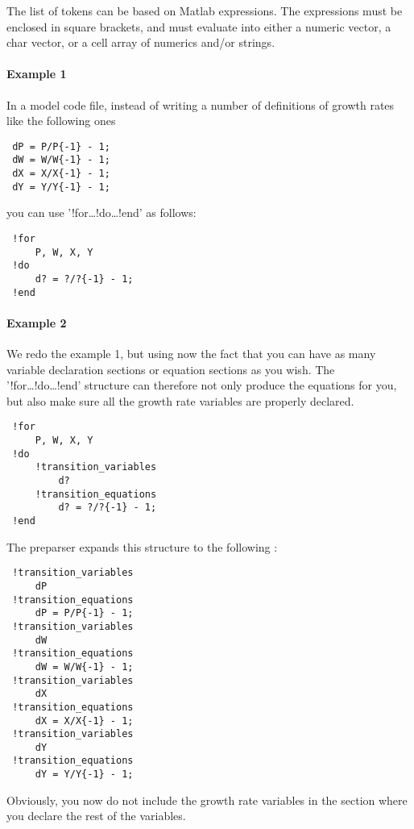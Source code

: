  The list of tokens can be based on Matlab expressions. The expressions
 must be enclosed in square brackets, and must evaluate into either a
 numeric vector, a char vector, or a cell array of numerics and/or
 strings.
 
 \paragraph{Example 1}
 
 In a model code file, instead of writing a number of definitions of
 growth rates like the following ones
 
 \begin{verbatim}
 dP = P/P{-1} - 1;
 dW = W/W{-1} - 1;
 dX = X/X{-1} - 1;
 dY = Y/Y{-1} - 1;
 \end{verbatim}
 
 you can use '!for\ldots{}!do\ldots{}!end' as follows:
 
 \begin{verbatim}
 !for
     P, W, X, Y
 !do
     d? = ?/?{-1} - 1;
 !end
 \end{verbatim}
 
 \paragraph{Example 2}
 
 We redo the example 1, but using now the fact that you can have as many
 variable declaration sections or equation sections as you wish. The
 '!for\ldots{}!do\ldots{}!end' structure can therefore not only produce
 the equations for you, but also make sure all the growth rate variables
 are properly declared.
 
 \begin{verbatim}
 !for
     P, W, X, Y
 !do
     !transition_variables
         d?
     !transition_equations
         d? = ?/?{-1} - 1;
 !end
 \end{verbatim}
 
 The preparser expands this structure to the following :
 
 \begin{verbatim}
 !transition_variables
     dP
 !transition_equations
     dP = P/P{-1} - 1;
 !transition_variables
     dW
 !transition_equations
     dW = W/W{-1} - 1;
 !transition_variables
     dX
 !transition_equations
     dX = X/X{-1} - 1;
 !transition_variables
     dY
 !transition_equations
     dY = Y/Y{-1} - 1;
 \end{verbatim}
 
 Obviously, you now do not include the growth rate variables in the
 section where you declare the rest of the variables.
 
